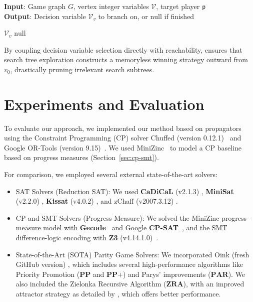 \documentclass[a4paper,fleqn]{cas-sc}
\begin{document}
\begin{algorithm}[htb]
\small
\caption{\textbf{\textit{NOCBrancherInt}}}
\textbf{Input}: Game graph $G$, vertex integer variables $\mathcal{V}$, target player $\mathsf{p}$ \\
\textbf{Output}: Decision variable $\mathcal{V}_v$ to branch on, or $\text{null}$ if finished
\begin{algorithmic}[1]
                \RETURN $\mathcal{V}_v$
            \ENDIF
        \ENDIF
    \ENDFOR
    \RETURN $\text{null}$
\end{algorithmic}
\label{alg:brancher-int}
\end{algorithm}

By coupling decision variable selection directly with reachability, \nocbrancher ensures that search tree exploration constructs a memoryless winning strategy outward from $v_0$, drastically pruning irrelevant search subtrees.

\section{Experiments and Evaluation}\label{sec:experiments}

To evaluate our approach, we implemented our method based on \noc propagators using the Constraint Programming (CP) solver Chuffed (version 0.12.1)~\citep{chuffed:2018} and Google OR-Tools (version 9.15)~\citep{Perron:2024}. We used MiniZinc~\citep{DBLP:conf/cp/NethercoteSBBDT07} to model a CP baseline based on progress measures (Section~\ref{sec:cp-smt}).

For comparison, we employed several external state-of-the-art solvers: 
\begin{itemize}
    \item SAT Solvers (Reduction SAT): We used \textbf{CaDiCaL} (v2.1.3) \citep{Biere:Cadical:2024}, \textbf{MiniSat} (v2.2.0) \citep{Een:MiniSat:2003}, \textbf{Kissat} (v4.0.2) \citep{Biere:Kissat:2024}, and zChaff (v2007.3.12) \citep{Moskewicz:zChaff:2001}.
    \item CP and SMT Solvers (Progress Measure): We solved the MiniZinc progress-measure model with \textbf{Gecode}~\citep{Gecode:2019} and Google \textbf{CP-SAT}~\citep{Perron:2024}, and the SMT difference-logic encoding with \textbf{Z3} (v4.14.1.0)~\citep{deMoura:2008}.
    \item State-of-the-Art (SOTA) Parity Game Solvers: We incorporated Oink (fresh GitHub version) \citep{vanDijk:2018}, which includes several high-performance algorithms like Priority Promotion ($\textbf{PP}$ and $\textbf{PP+}$) and Parys' improvements ($\textbf{PAR}$). We also included the Zielonka Recursive Algorithm ($\textbf{ZRA}$), with an improved attractor strategy as detailed by \citet{Aggarwal:2023}, which offers better performance. 
\end{itemize}
\end{document}

